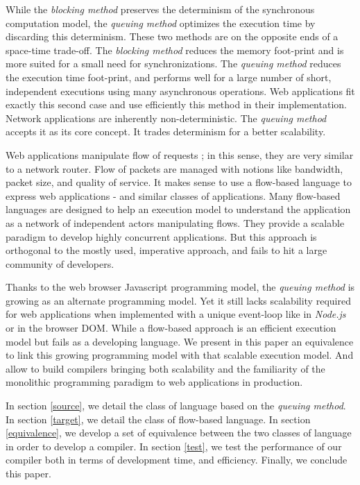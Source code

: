 While the \textit{blocking method} preserves the determinism of the synchronous computation model, the \textit{queuing method} optimizes the execution time by discarding this determinism.
These two methods are on the opposite ends of a space-time trade-off.
The \textit{blocking method} reduces the memory foot-print and is more suited for a small need for synchronizations.
The \textit{queuing method} reduces the execution time foot-print, and performs well for a large number of short, independent executions using many asynchronous operations.
Web applications fit exactly this second case and use efficiently this method in their implementation.
Network applications are inherently non-deterministic.
The \textit{queuing method} accepts it as its core concept.
It trades determinism for a better scalability.

Web applications manipulate flow of requests ; in this sense, they are very similar to a network router.
Flow of packets are managed with notions like bandwidth, packet size, and quality of service.
It makes sense to use a flow-based language to express web applications - and similar classes of applications.
Many flow-based languages are designed to help an execution model to understand the application as a network of independent actors manipulating flows.
They provide a scalable paradigm to develop highly concurrent applications.
But this approach is orthogonal to the mostly used, imperative approach, and fails to hit a large community of developers.

Thanks to the web browser Javascript programming model, the \textit{queuing method} is growing as an alternate programming model.
Yet it still lacks scalability required for web applications when implemented with a unique event-loop like in \textit{Node.js} or in the browser DOM.
While a flow-based approach is an efficient execution model but fails as a developing language.
We present in this paper an equivalence to link this growing programming model with that scalable execution model.
And allow to build compilers bringing both scalability and the familiarity of the monolithic programming paradigm to web applications in production.

In section \ref{source}, we detail the class of language based on the \textit{queuing method}.
In section \ref{target}, we detail the class of flow-based language.
In section \ref{equivalence}, we develop a set of equivalence between the two classes of language in order to develop a compiler.
In section \ref{test}, we test the performance of our compiler both in terms of development time, and efficiency.
Finally, we conclude this paper.